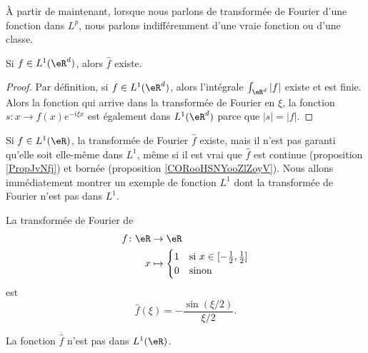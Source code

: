 À partir de maintenant, lorsque nous parlons de transformée de Fourier d'une fonction dans \( L^p\), nous parlons indifféremment d'une vraie fonction ou d'une classe.

\begin{lemma}
    Si \( f\in L^1(\eR^d)\), alors \( \hat f\) existe.
\end{lemma}

\begin{proof}
    Par définition, si \( f\in L^1(\eR^d)\), alors l'intégrale \( \int_{\eR^d}| f |\) existe et est finie. Alors la fonction qui arrive dans la transformée de Fourier en \( \xi\), la fonction \( s\colon x\to f(x) e^{-i\xi x}\) est également dans \( L^1(\eR^d)\) parce que \( | s |=| f |\).
\end{proof}

\begin{normaltext}
    Si \( f\in L^1(\eR)\), la transformée de Fourier \( \hat f\) existe, mais il n'est pas garanti qu'elle soit elle-même dans \( L^1\), même si il est vrai que \( \hat f\) est continue (proposition \ref{PropJvNfj}) et bornée (proposition \ref{CORooHSNYooZlZoyV}). Nous allons immédiatement montrer un exemple de fonction \( L^1\) dont la transformée de Fourier n'est pas dans \( L^1\).
\end{normaltext}

\begin{lemma}       \label{LEMooROPHooOSguhN}
    La transformée de Fourier de
    \begin{equation}
        \begin{aligned}
            f\colon \eR&\to \eR \\
            x&\mapsto \begin{cases}
                1    &   \text{si } x\in \mathopen[ -\frac{ 1 }{2} , \frac{ 1 }{2} \mathclose]\\
                0    &    \text{sinon }
            \end{cases}
        \end{aligned}
    \end{equation}
    est 
    \begin{equation}
        \hat f(\xi)=-\frac{ \sin(\xi/2) }{ \xi/2 }.
    \end{equation}

    La fonction \( \hat f\) n'est pas dans \( L^1(\eR)\).
\end{lemma}


